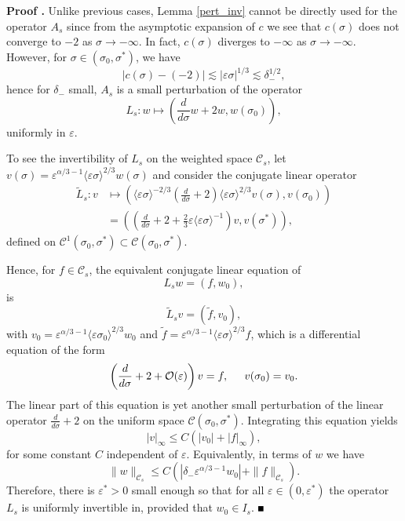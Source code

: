 \documentclass[letterpaper,11pt]{article}
\newcommand{\rmO}{\mathcal{O}}
\newcommand{\eps}{\varepsilon}
\newcommand{\lar}{ \lesssim }
\numberwithin{equation}{section}
\theoremstyle{plain}
\newenvironment{Proof}[1][\unskip]%
 {\begin{trivlist} \item[]{\bf Proof #1. }}%
 {\hspace*{\fill}$\rule{.4\baselineskip}{.4\baselineskip}$\end{trivlist}}
\begin{document}
\begin{Proof}Unlike previous cases, Lemma \ref{pert_inv} cannot be directly used for the operator $A_s$ since from the asymptotic expansion of $c$ we see that $c(\sigma)$ does not converge to $-2$ as $\sigma \to -\infty$. In fact, $c(\sigma)$ diverges to $-\infty$ as $\sigma \to -\infty$. 
However, for $\sigma \in (\sigma_0, \sigma^*)$, we have
\[
|c(\sigma) - (-2) | \lar |\eps\sigma|^{1/3} \lar \delta_-^{1/2},
\]
hence for $\delta_-$ small, $A_s$ is a small perturbation of the operator
\[
L_s : w \mapsto \left( \frac{d}{d\sigma}w+2w, w(\sigma_0)\right),
\]
uniformly in $\eps$.

To see the invertibility of $L_s$ on the weighted space $\mathcal{C}_s$, let $v(\sigma) = \eps^{\alpha/3-1}\langle \eps \sigma \rangle^{2/3}w(\sigma)$ and consider the conjugate linear operator
\begin{align*}
\tilde{L}_s: v &\mapsto \left( \langle \eps \sigma \rangle^{-2/3}\left(\frac{d}{d\sigma} + 2\right) \langle \eps \sigma \rangle^{2/3} v(\sigma), v(\sigma_0) \right)\\
&= \left( \left(\frac{d}{d\sigma}+2+\frac{2}{3}\eps\langle \eps\sigma \rangle^{-1}\right)  v, v(\sigma^*) \right),
\end{align*}
defined on $\mathcal{C}^1(\sigma_0, \sigma^*)\subset \mathcal{C}(\sigma_0, \sigma^*)$. 

Hence, for $f\in \mathcal{C}_s$, the equivalent conjugate linear equation of 
\[
L_s w = (f,w_0),
\]
is 
\[
\tilde{L}_s v = (\tilde{f}, v_0),
\]
with $v_0 = \eps^{\alpha/3-1}\langle \eps \sigma_0 \rangle^{2/3} w_0$ and $\tilde{f} = \eps^{\alpha/3-1}\langle \eps \sigma \rangle^{2/3}f$, which is a differential equation of the form
\[
\left( \frac{d}{d\sigma}+2+\rmO(\eps) \right) v =f, \hspace{0.2in} v(\sigma_0) = v_0.
\]
The linear part of this equation is yet another small perturbation of the linear operator $\frac{d}{d\sigma}+2$ on the uniform space $\mathcal{C}(\sigma_0, \sigma^*)$. Integrating this equation yields
\[
|v|_\infty \le C(|v_0|+|f|_\infty),
\]
for some constant $C$ independent of $\eps$. Equivalently, in terms of $w$ we have
\begin{equation}\label{linear_est:s}
\|w\|_{\mathcal{C}_s} \le C(|\delta_- \eps^{\alpha/3-1}w_0|+ \|f\|_{\mathcal{C}_s}).
\end{equation}
Therefore, there is $\eps^*>0$ small enough so that for all $\eps \in (0,\eps^*)$ the operator $L_s$ is uniformly invertible in, provided that $w_0 \in I_s$. 
\end{Proof}
\end{document}

